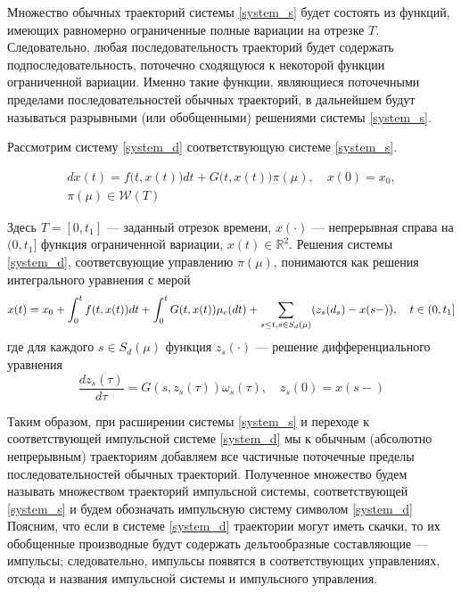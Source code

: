 Множество обычных траекторий системы \eqref{system_s} будет состоять
из функций, имеющих равномерно ограниченные полные вариации на отрезке
$T$. Следовательно, любая последовательность траекторий будет
содержать подпоследовательность, поточечно сходящуюся к некоторой
функции ограниченной вариации. Именно такие функции, являющиеся
поточечными пределами последовательностей обычных траекторий, в
дальнейшем будут называться разрывными (или обобщенными) решениями
системы \eqref{system_s}.

 Рассмотрим систему \eqref{system_d} соответствующую системе
\eqref{system_s}.

\begin{equation}
  \label{system_d}
  \begin{array}{l}
    dx(t)=f\big(t,x(t)\big)dt+G\big(t,x(t)\big)\pi(\mu), \quad
    x(0)=x_0, \\[8pt]
    \pi(\mu) \in \mathcal{W}(T)
  \end{array} 
\end{equation}

Здесь $T=[0,t_1]$ --- заданный отрезок времени, $x(\cdot)$ ---
непрерывная справа на $(0,t_1]$ функция ограниченной вариации, $x(t)
\in \mathbb{R}^2$. Решения системы \eqref{system_d}, соответсвующие
управлению $\pi(\mu)$, понимаются как решения интегрального уравнения
с мерой
\begin{equation*}
  x(t) = x_0 + \int_0^t f(t,x(t))dt + \int_0^t G(t,x(t)) \mu_c(dt) +
  \sum_{s \le t,\\s \in S_d(\mu)} (z_s(d_s) - x(s-)), \quad t \in (0,t_1]
\end{equation*}
где для каждого $s \in S_d(\mu)$ функция $z_s(\cdot)$ --- решение
дифференциального уравнения
\begin{equation*}
  \frac{dz_s(\tau)}{d\tau} = G(s,z_s(\tau))\omega_s(\tau), \quad z_s(0)=x(s-)
\end{equation*}

Таким образом, при расширении системы \eqref{system_s} и переходе к
соответствующей импульсной системе \eqref{system_d} мы к обычным
(абсолютно непрерывным) траекториям добавляем все частичные
поточечные пределы последовательностей обычных
траекторий. Полученное множество будем называть множеством
траекторий импульсной системы, соответствующей \eqref{system_s} и будем
обозначать импульсную систему символом \eqref{system_d} Поясним,
что если в системе \eqref{system_d} траектории могут иметь скачки,
то их обобщенные производные будут содержать дельтообразные
составляющие --- импульсы; следовательно, импульсы появятся в
соответствующих управлениях, отсюда и названия импульсной системы и
импульсного управления.

